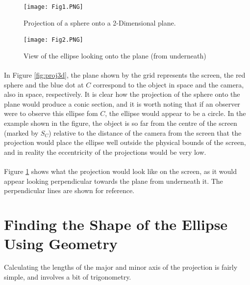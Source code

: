\documentclass{article}
\newcommand\dd{{2-Dimensional}\xspace}
\begin{document}
	\begin{figure}
		\texttt{[image: Fig1.PNG]}
		\caption{Projection of a sphere onto a \dd plane.}
		\label{fig:proj3d}	
		\texttt{[image: Fig2.PNG]}
		\caption{View of the ellipse looking onto the plane (from underneath)}
		\label{fig:proj2d}
	\end{figure}

	\paragraph{}
	In Figure \ref{fig:proj3d}, the plane shown by the grid represents the screen, the red sphere and the blue dot at $C$ correspond to the object in space and
	the camera, also in space, respectively. It is clear how the projection of the sphere onto the plane would produce a conic section, and it is
	worth noting that if an observer were to observe this ellipse fom $C$, the ellipse would appear to be a circle. In the example shown in the
	figure, the object is so far from the centre of the screen (marked by $S_C$) relative to the distance of the camera from the screen that the
	projection would place the ellipse well outside the physical bounds of the screen, and in reality the eccentricity of the projections would be very low.
	\paragraph{}
	Figure \ref{fig:proj2d} shows what the projection would look like on the screen, as it would appear looking perpendicular towards the plane from
	underneath it. The perpendicular lines are shown for reference.


\section{Finding the Shape of the Ellipse Using Geometry}
	Calculating the lengths of the major and minor axis of the projection is fairly simple, and involves a bit of trigonometry.
\end{document}
